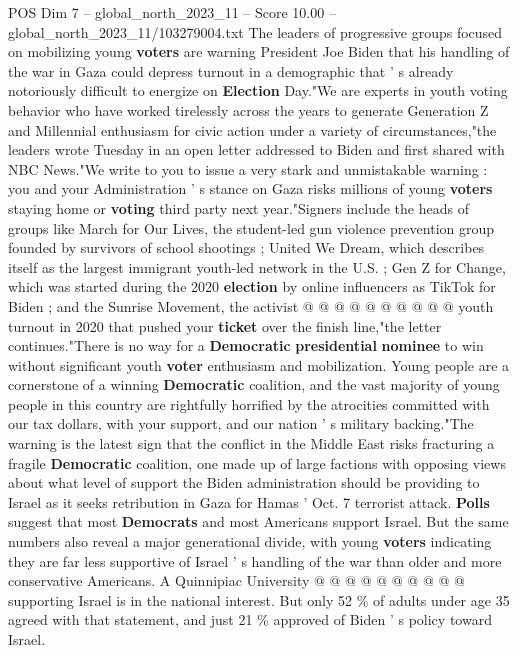 \begin{textsample}{POS Dim 7 – global\_north\_2023\_11 – Score 10.00 – global\_north\_2023\_11/103279004.txt}  \label{ex:f7_pos_129}
The leaders of progressive groups focused on mobilizing young \textbf{voters} are warning President Joe Biden that his handling of the war in Gaza could depress turnout in a demographic that ' s already notoriously difficult to energize on \textbf{Election} Day."We are experts in youth voting behavior who have worked tirelessly across the years to generate Generation Z and Millennial enthusiasm for civic action under a variety of circumstances,"the leaders wrote Tuesday in an open letter addressed to Biden and first shared with NBC News."We write to you to issue a very stark and unmistakable warning : you and your Administration ' s stance on Gaza risks millions of young \textbf{voters} staying home or \textbf{voting} third party next year."Signers include the heads of groups like March for Our Lives, the student-led gun violence prevention group founded by survivors of school shootings ; United We Dream, which describes itself as the largest immigrant youth-led network in the U.S. ; Gen Z for Change, which was started during the 2020 \textbf{election} by online influencers as TikTok for Biden ; and the Sunrise Movement, the activist @ @ @ @ @ @ @ @ @ @ youth turnout in 2020 that pushed your \textbf{ticket} over the finish line,"the letter continues."There is no way for a \textbf{Democratic} \textbf{presidential} \textbf{nominee} to win without significant youth \textbf{voter} enthusiasm and mobilization.
Young people are a cornerstone of a winning \textbf{Democratic} coalition, and the vast majority of young people in this country are rightfully horrified by the atrocities committed with our tax dollars, with your support, and our nation ' s military backing."The warning is the latest sign that the conflict in the Middle East risks fracturing a fragile \textbf{Democratic} coalition, one made up of large factions with opposing views about what level of support the Biden administration should be providing to Israel as it seeks retribution in Gaza for Hamas ' Oct. 7 terrorist attack. \textbf{Polls} suggest that most \textbf{Democrats} and most Americans support Israel.
But the same numbers also reveal a major generational divide, with young \textbf{voters} indicating they are far less supportive of Israel ' s handling of the war than older and more conservative Americans.
A Quinnipiac University @ @ @ @ @ @ @ @ @ @ supporting Israel is in the national interest.
But only 52 \% of adults under age 35 agreed with that statement, and just 21 \% approved of Biden ' s policy toward Israel.

\end{textsample}

